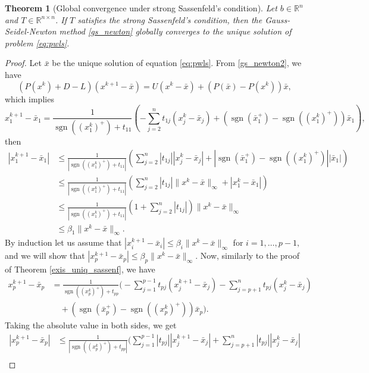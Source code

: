 \documentclass[11pt]{article}
\newtheorem{theorem}{Theorem}[section]
\DeclareMathOperator{\sgn}{sgn}
\newcommand{\R}{\mathbb R}
\begin{document}
\begin{theorem}[Global convergence under strong Sassenfeld's condition]\label{glob_conv_GSN}
Let $b \in \R^n$ and $T\in\R^{n\times n}$. If $T$ satisfies the strong Sassenfeld's condition, then the Gauss-Seidel-Newton method \eqref{gs_newton} globally converges to the unique solution of problem \eqref{eq:pwls}.
\end{theorem}
\begin{proof}
Let $\bar x$ be the unique solution of equation \eqref{eq:pwls}. From \eqref{gs_newton2}, we have 
\begin{equation*}
(P(x^{k})+D-L)(x^{k+1}-\bar x) = U(x^{k}-\bar x)+(P(\bar x)-P(x^{k}))\bar x,
\end{equation*} which implies
\begin{equation*}
x^{k+1}_1-\bar x_1 = \frac{1}{\sgn((x^{k}_1)^+)+t_{11}}\left( -\sum_{j=2}^n t_{1j}(x^{k}_j-\bar x_j) + (\sgn(\bar x_1^+)-\sgn((x^{k}_1)^+))\bar x_1 \right),
\end{equation*} then
\begin{align*}
|x^{k+1}_1-\bar x_1| &\leq \frac{1}{|\sgn((x^{k}_1)^+)+t_{11}|}\left( \sum_{j=2}^n |t_{1j}||x^{k}_j-\bar x_j| + |\sgn(\bar x_1^+)-\sgn((x^{k}_1)^+)||\bar x_1| \right)\\
&\leq \frac{1}{|\sgn((x^{k}_1)^+)+t_{11}|}\left( \sum_{j=2}^n |t_{1j}|\|x^{k}-\bar x\|_{\infty} + |x^{k}_1-\bar x_1| \right)\\
&\leq \frac{1}{|\sgn((x^{k}_1)^+)+t_{11}|}\left( 1 + \sum_{j=2}^n |t_{1j}| \right)\|x^{k}-\bar x\|_{\infty}\\
&\leq \beta_1\|x^{k}-\bar x\|_{\infty}.
\end{align*}
By induction let us assume that $|x^{k+1}_i-\bar x_i| \leq \beta_i\|x^{k}-\bar x\|_{\infty}$ for $i=1,\dots,p-1,$ and we will show that $|x^{k+1}_p-\bar x_p| \leq \beta_p\|x^{k}-\bar x\|_{\infty}$.
Now, similarly to the proof of Theorem \ref{exis_uniq_sassenf}, we have
\begin{align*}
x^{k+1}_p-\bar x_p &= \frac{1}{\sgn((x^{k}_p)^+)+t_{pp}}\Biggl( -\sum_{j=1}^{p-1} t_{pj}(x^{k+1}_j-\bar x_j) - \sum_{j=p+1}^n t_{pj}(x^{k}_j-\bar x_j) \\
&\quad + (\sgn(\bar x_p^+)-\sgn((x^{k}_p)^+))\bar x_p \Biggr).
\end{align*}
Taking the absolute value in both sides, we get
\begin{align*}
|x^{k+1}_p-\bar x_p| &\leq \frac{1}{|\sgn((x^{k}_p)^+)+t_{pp}|}\Biggl( \sum_{j=1}^{p-1} |t_{pj}||x^{k+1}_j-\bar x_j| + \sum_{j=p+1}^n |t_{pj}||x^{k}_j-\bar x_j| \\

\end{align*}
\end{proof}
\end{document}
